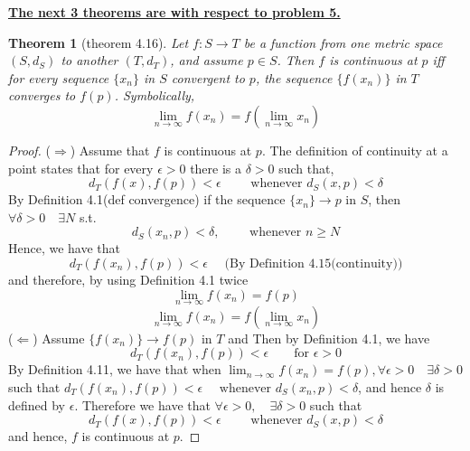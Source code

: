 \documentclass[aps,pra,notitlepage,amsmath,amssymb,letterpaper,12pt]{revtex4-1}
\newtheorem{theorem}{Theorem}
\begin{document}
\underline{\textbf{The next 3 theorems are with respect to problem 5.}}
\begin{theorem}[theorem 4.16]
Let $f:S \to T$  be a function from one metric space $(S,d_{S})$ to another $(T,d_{T})$, and assume $p \in S$. Then $f$ is continuous at $p$ iff for every sequence $\{x_{n}\}$ in $S$ convergent to $p$, the sequence $\{f(x_{n})\}$ in $T$ converges to $f(p)$. Symbolically,
\[\lim_{n \to \infty} f(x_{n}) = f(\lim_{n \to \infty} x_{n})\]
\end{theorem}
\begin{proof}
($\Longrightarrow$) Assume that $f$ is continuous at $p$. The definition of continuity at a point states that for every $\epsilon > 0$ there is a $\delta >0$ such that,
\[d_{T}(f(x),f(p)) < \epsilon \qquad \textrm{  whenever  } d_{S}(x,p) < \delta\]
By Definition 4.1(def convergence) if the sequence $\{x_{n}\} \rightarrow p$ in $S$, then  $\forall \delta > 0 \quad \exists N$ s.t. $$d_{S}(x_{n},p) < \delta, \qquad \textrm{ whenever } n \geq N$$
Hence, we have that
$$d_{T}(f(x_{n}),f(p)) < \epsilon \quad \textrm{ (By Definition 4.15(continuity))}$$
and therefore, by using Definition 4.1 twice
$$\lim_{n \to \infty} f(x_{n}) = f(p) $$
$$\lim_{n \to \infty} f(x_{n}) = f(\lim_{n \to \infty}x_{n}) $$
($\Longleftarrow$) Assume $\{f(x_{n})\} \to f(p)$ in $T$ and %
Then by Definition 4.1, we have
\[d_{T}(f(x_{n}),f(p)) < \epsilon \qquad \textrm{for } \epsilon > 0\]%
By Definition 4.11, we have that when $\lim_{n \to \infty}f(x_{n}) = f(p), \forall \epsilon > 0 \quad \exists \delta >0 $ such that
\newline{}
$d_{T}(f(x_{n}),f(p)) < \epsilon \quad \textrm{ whenever } d_{S}(x_{n},p) < \delta$, and hence $\delta$ is defined by $\epsilon$. Therefore we have that $\forall \epsilon > 0, \quad \exists \delta > 0$ such that
\[d_{T}(f(x),f(p)) < \epsilon \qquad \textrm{  whenever  } d_{S}(x,p) < \delta\]
and hence, $f$ is continuous at $p$.

\end{proof}
\end{document}
